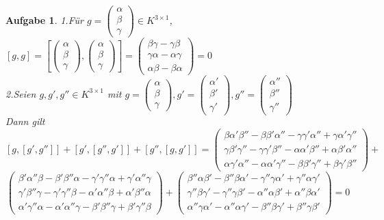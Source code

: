 \documentclass[12pt,leqno,twoside]{book}
\newtheorem{AG}{Aufgabe}
\begin{document}
\begin{AG}
1.F\"{u}r $g=\left(\begin{array}{c} \alpha \\ \beta \\ \gamma \end{array}\right)\in K^{3\times1}$, $[g,g]=\left[\left(\begin{array}{c} \alpha \\ \beta \\ \gamma \end{array}\right),\left(\begin{array}{c} \alpha \\ \beta \\ \gamma \end{array}\right)\right]=\left(\begin{array}{c} \beta\gamma-\gamma\beta \\ \gamma\alpha-\alpha\gamma \\ \alpha\beta-\beta\alpha \end{array}\right)=0$\\
2.Seien $g,g',g''\in K^{3\times1}$ mit $g=\left(\begin{array}{c} \alpha \\ \beta \\ \gamma \end{array}\right),g'=\left(\begin{array}{c} \alpha' \\ \beta' \\ \gamma' \end{array}\right),g''=\left(\begin{array}{c} \alpha'' \\ \beta'' \\ \gamma'' \end{array}\right)$\\
Dann gilt 
\[[g,[g',g'']]+[g',[g'',g']]+[g'',[g,g']]=\left(\begin{array}{c} \beta\alpha'\beta''-\beta\beta'\alpha''-\gamma\gamma'\alpha''+\gamma\alpha'\gamma'' \\ \gamma\beta'\gamma''-\gamma\gamma'\beta''-\alpha\alpha'\beta''+\alpha\beta'\alpha'' \\ \alpha\gamma'\alpha''-\alpha\alpha'\gamma''-\beta\beta'\gamma''+\beta\gamma'\beta'' \end{array}\right)+\]\[\left(\begin{array}{c} \beta'\alpha''\beta-\beta'\beta''\alpha-\gamma'\gamma''\alpha+\gamma'\alpha''\gamma \\ \gamma'\beta''\gamma-\gamma'\gamma''\beta-\alpha'\alpha''\beta+\alpha'\beta''\alpha \\ \alpha'\gamma''\alpha-\alpha'\alpha''\gamma-\beta'\beta''\gamma+\beta'\gamma''\beta \end{array}\right)+\left(\begin{array}{c} \beta''\alpha\beta'-\beta''\beta\alpha'-\gamma''\gamma\alpha'+\gamma''\alpha\gamma' \\ \gamma''\beta\gamma'-\gamma''\gamma\beta'-\alpha''\alpha\beta'+\alpha''\beta\alpha' \\ \alpha''\gamma\alpha'-\alpha''\alpha\gamma'-\beta''\beta\gamma'+\beta''\gamma\beta' \end{array}\right)=0\]

\end{AG}
\end{document}
